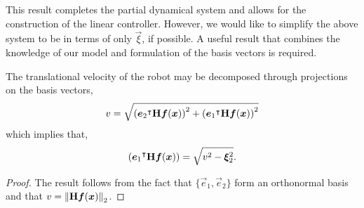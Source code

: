 This result completes the partial dynamical system and allows for the construction of the linear controller. However, we would like to simplify the above system to be in terms of only $\vec{\xi}$, if possible. A useful result that combines the knowledge of our model and formulation of the basis vectors is required.
\begin{lemma}
    The translational velocity of the robot may be decomposed through projections on the basis vectors,
    $$
        v = \sqrt{ \left({\bm{e}_2}^{\intercal}\mathbf{H}\bm{f}(\bm{x})\right)^2 + \left({\bm{e}_1}^{\intercal}\mathbf{H}\bm{f}(\bm{x})\right)^2 }
    $$
    which implies that,
    $$
        \left({\bm{e}_1}^{\intercal}\mathbf{H}\bm{f}(\bm{x})\right) = \sqrt{v^2 - \bm{\xi}_2^2}.
    $$
\end{lemma}
\begin{proof}
    The result follows from the fact that $\{ \vec{e}_1, \vec{e}_2 \}$ form an orthonormal basis and that $v = \mathop{}\!\left\|\mathbf{H}\bm{f}(\bm{x})\right\|_2$.
\end{proof}
